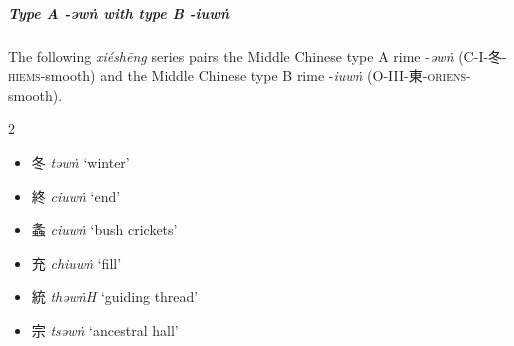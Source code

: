 \subparagraph{Type A -\textit{əwṅ} with type B -\textit{iuwṅ}}
\label{subpara:typeA-awng-typeB-iuwng}
The following \textit{xiéshēng} series pairs the Middle Chinese type A rime -\textit{əwṅ} (C-I-冬-\textsc{hiems}-smooth) and the Middle Chinese type B rime -\textit{iuwṅ} (O-III-東-\textsc{oriens}-smooth).

\medskip


\begin{multicols}{2}
\raggedcolumns
\begin{itemize}
    \item {\Large{冬}} %
    \textit{təwṅ} `winter' %

    \item {\Large{終}} %
    \textit{ciuwṅ} `end' %

    \item {\Large{螽}} %
    \textit{ciuwṅ} `bush crickets' %
\end{itemize}

\medskip





\medskip



\begin{itemize}

\item {\Large{充}} %
    \textit{chiuwṅ} `fill' %

    \item {\Large{統}} %
    \textit{thəwṅH} `guiding thread' %
\end{itemize}

\bigskip 


\begin{minipage}{\columnwidth}
\begin{itemize}[leftmargin=*, labelsep=0.5em]  
\item {\Large{宗}} %
    \textit{tsəwṅ} `ancestral hall' %


\end{itemize}
\end{minipage}
\end{multicols}
